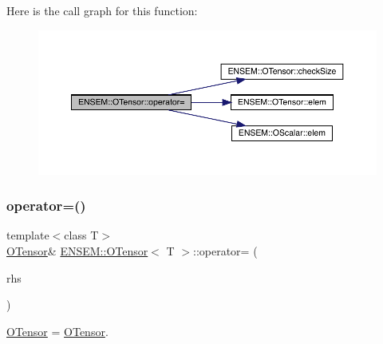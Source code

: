 Here is the call graph for this function\+:
\nopagebreak
\begin{figure}[H]
\begin{center}
\leavevmode
\includegraphics[width=350pt]{da/d8a/classENSEM_1_1OTensor_ae763ca68be1d6b8d5b27b8d544ab5f2d_cgraph}
\end{center}
\end{figure}
\mbox{\label{classENSEM_1_1OTensor_a08690a1808269fccd113a9d634c7a73f}} 
\subsubsection{\texorpdfstring{operator=()}{operator=()}\hspace{0.1cm}{\footnotesize\ttfamily [7/12]}}
{\footnotesize\ttfamily template$<$class T$>$ \\
\mbox{\hyperlink{classENSEM_1_1OTensor}{O\+Tensor}}\& \mbox{\hyperlink{classENSEM_1_1OTensor}{E\+N\+S\+E\+M\+::\+O\+Tensor}}$<$ T $>$\+::operator= (\begin{DoxyParamCaption}\item[{const \mbox{\hyperlink{classENSEM_1_1OTensor}{O\+Tensor}}$<$ T $>$ \&}]{rhs }\end{DoxyParamCaption})\hspace{0.3cm}{\ttfamily [inline]}}



\mbox{\hyperlink{classENSEM_1_1OTensor}{O\+Tensor}} = \mbox{\hyperlink{classENSEM_1_1OTensor}{O\+Tensor}}. 

